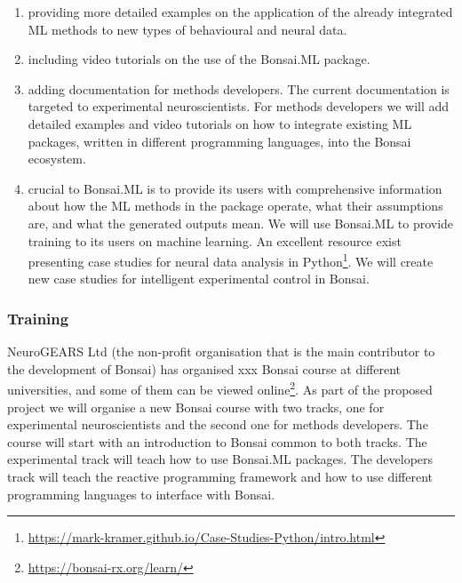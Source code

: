 \begin{enumerate}

    \item providing more detailed examples on the application of the
        already integrated ML methods to new types of behavioural and
        neural data.

    \item including video tutorials on the use of the Bonsai.ML
        package.

    \item adding documentation for methods developers. The current
        documentation is targeted to experimental neuroscientists. For
        methods developers we will add detailed examples and video
        tutorials on how to integrate existing ML packages, written in
        different programming languages, into the Bonsai ecosystem.

    \item crucial to Bonsai.ML is to provide its users with comprehensive
        information about how the ML methods in the package operate, what
        their assumptions are, and what the generated outputs mean. We will
        use Bonsai.ML to provide training to its users on machine learning.
        An excellent resource exist presenting case studies for neural data
        analysis in
        Python\footnote[9]{\url{https://mark-kramer.github.io/Case-Studies-Python/intro.html}}.
        We will create new case studies for intelligent experimental
        control in Bonsai.

\end{enumerate}

\subsubsection*{Training}

NeuroGEARS Ltd (the non-profit organisation that is the main contributor to the
development of Bonsai) has organised xxx Bonsai course at different
universities, and some of them can be viewed
online\footnote[10]{\url{https://bonsai-rx.org/learn/}}. As part of the
proposed project we will organise a new Bonsai course with two tracks, one for
experimental neuroscientists and the second one for methods developers. The
course will start with an introduction to Bonsai common to both tracks. The
experimental track will teach how to use Bonsai.ML packages. The developers
track will teach the reactive programming framework and how to use different
programming languages to interface with Bonsai.

